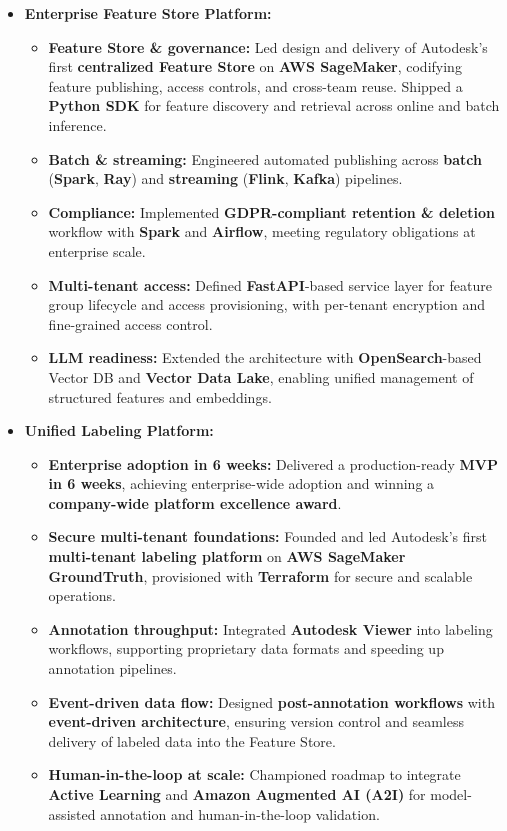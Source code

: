 \begin{itemize}[leftmargin=1.25em, topsep=1pt, partopsep=1.5pt]
\item \textbf{Enterprise Feature Store Platform:}
    \begin{itemize}[leftmargin=2.25em]
        \setlength\itemsep{0.2em}
        \item \textbf{Feature Store \& governance:} Led design and delivery of Autodesk's first \textbf{centralized Feature Store} on \textbf{AWS SageMaker}, codifying feature publishing, access controls, and cross-team reuse. Shipped a \textbf{Python SDK} for feature discovery and retrieval across online and batch inference.
        \item \textbf{Batch \& streaming:} Engineered automated publishing across \textbf{batch} (\textbf{Spark}, \textbf{Ray}) and \textbf{streaming} (\textbf{Flink}, \textbf{Kafka}) pipelines.
        \item \textbf{Compliance:} Implemented \textbf{GDPR-compliant retention \& deletion} workflow with \textbf{Spark} and \textbf{Airflow}, meeting regulatory obligations at enterprise scale.
        \item \textbf{Multi-tenant access:} Defined \textbf{FastAPI}-based service layer for feature group lifecycle and access provisioning, with per-tenant encryption and fine-grained access control.
        \item \textbf{LLM readiness:} Extended the architecture with \textbf{OpenSearch}-based Vector DB and \textbf{Vector Data Lake}, enabling unified management of structured features and embeddings.
    \end{itemize}
\vspace{0.4em}

\item \textbf{Unified Labeling Platform:}
    \begin{itemize}[leftmargin=2.25em]
        \setlength\itemsep{0.2em}
        \item \textbf{Enterprise adoption in 6 weeks:} Delivered a production-ready \textbf{MVP in 6 weeks}, achieving enterprise-wide adoption and winning a \textbf{company-wide platform excellence award}.
        \item \textbf{Secure multi-tenant foundations:} Founded and led Autodesk's first \textbf{multi-tenant labeling platform} on \textbf{AWS SageMaker GroundTruth}, provisioned with \textbf{Terraform} for secure and scalable operations.
        \item \textbf{Annotation throughput:} Integrated \textbf{Autodesk Viewer} into labeling workflows, supporting proprietary data formats and speeding up annotation pipelines.
        \item \textbf{Event-driven data flow:} Designed \textbf{post-annotation workflows} with \textbf{event-driven architecture}, ensuring version control and seamless delivery of labeled data into the Feature Store.
        \item \textbf{Human-in-the-loop at scale:} Championed roadmap to integrate \textbf{Active Learning} and \textbf{Amazon Augmented AI (A2I)} for model-assisted annotation and human-in-the-loop validation.
    \end{itemize}
\vspace{0.4em}


\end{itemize}
